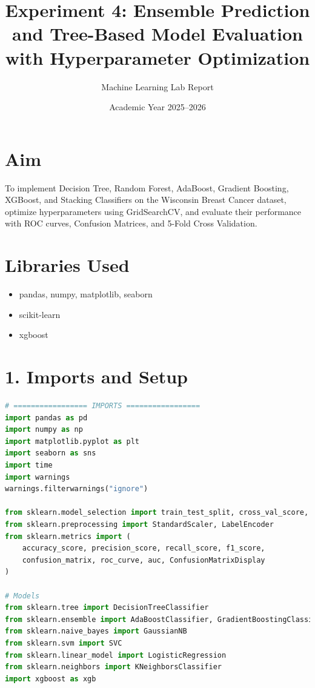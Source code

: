 \documentclass[12pt]{article}
\title{\textbf{Experiment 4: Ensemble Prediction and Tree-Based Model Evaluation with Hyperparameter Optimization}}
\author{Machine Learning Lab Report}
\date{Academic Year 2025--2026}
\begin{document}
\maketitle

\section*{Aim}
To implement Decision Tree, Random Forest, AdaBoost, Gradient Boosting, XGBoost, and Stacking Classifiers on the Wisconsin Breast Cancer dataset, optimize hyperparameters using GridSearchCV, and evaluate their performance with ROC curves, Confusion Matrices, and 5-Fold Cross Validation.

\section*{Libraries Used}
\begin{itemize}
\item pandas, numpy, matplotlib, seaborn
\item scikit-learn
\item xgboost
\end{itemize}

\section*{1. Imports and Setup}
\begin{lstlisting}[language=Python]
# ================= IMPORTS =================
import pandas as pd
import numpy as np
import matplotlib.pyplot as plt
import seaborn as sns
import time
import warnings
warnings.filterwarnings("ignore")

from sklearn.model_selection import train_test_split, cross_val_score, KFold, GridSearchCV
from sklearn.preprocessing import StandardScaler, LabelEncoder
from sklearn.metrics import (
    accuracy_score, precision_score, recall_score, f1_score,
    confusion_matrix, roc_curve, auc, ConfusionMatrixDisplay
)

# Models
from sklearn.tree import DecisionTreeClassifier
from sklearn.ensemble import AdaBoostClassifier, GradientBoostingClassifier, RandomForestClassifier, StackingClassifier
from sklearn.naive_bayes import GaussianNB
from sklearn.svm import SVC
from sklearn.linear_model import LogisticRegression
from sklearn.neighbors import KNeighborsClassifier
import xgboost as xgb
\end{lstlisting}
\end{document}
